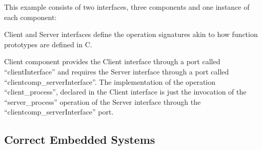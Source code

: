 This example consists of two interfaces, three components and one instance of each component:
\begin{compactdesc}
\item[Client and Server interfaces] define the operation signatures akin to how function prototypes are defined in C.
\item[Client component] provides the Client interface through a port called ``clientInterface'' and requires the Server interface through a port called ``clientcomp\_serverInterface''. The implementation of the operation ``client\_process'', declared in the Client interface is just the invocation of the ``server\_process'' operation of the Server interface through the ``clientcomp\_serverInterface'' port.
\end{compactdesc}




\subsection{Correct Embedded Systems}

